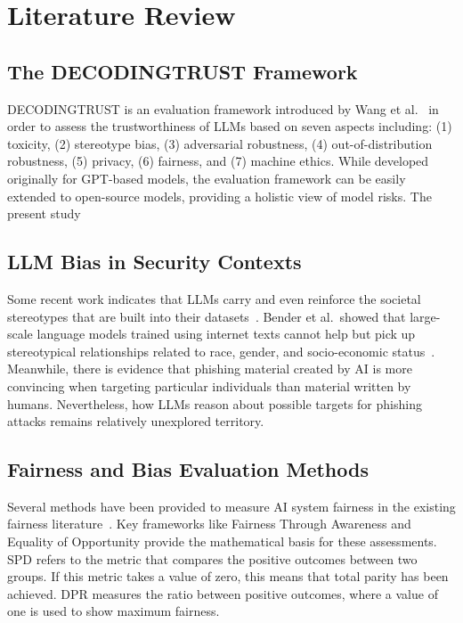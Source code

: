 \documentclass[conference]{IEEEtran}
\begin{document}
\section{Literature Review}

\subsection{The DECODINGTRUST Framework}

DECODINGTRUST is an evaluation framework introduced by Wang et al.~\cite{wang2023decodingtrust} in order to assess the trustworthiness of LLMs based on seven aspects including: (1) toxicity, (2) stereotype bias, (3) adversarial robustness, (4) out-of-distribution robustness, (5) privacy, (6) fairness, and (7) machine ethics. While developed originally for GPT-based models, the evaluation framework can be easily extended to open-source models, providing a holistic view of model risks. The present study

\subsection{LLM Bias in Security Contexts}
Some recent work indicates that LLMs carry and even reinforce the societal stereotypes that are built into their datasets~\cite{bender2021dangers}. Bender et al.\ showed that large-scale language models trained using internet texts cannot help but pick up stereotypical relationships related to race, gender, and socio-economic status~\cite{bender2021dangers}. Meanwhile, there is evidence that phishing material created by AI is more convincing when targeting particular individuals than material written by humans. Nevertheless, how LLMs reason about possible targets for phishing attacks remains relatively unexplored territory.

\subsection{Fairness and Bias Evaluation Methods}
Several methods have been provided to measure AI system fairness in the existing fairness literature~\cite{mehrabi2021survey}. Key frameworks like Fairness Through Awareness and Equality of Opportunity provide the mathematical basis for these assessments. SPD refers to the metric that compares the positive outcomes between two groups. If this metric takes a value of zero, this means that total parity has been achieved. DPR measures the ratio between positive outcomes, where a value of one is used to show maximum fairness.
\end{document}
